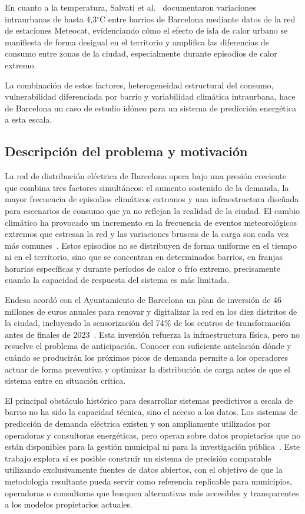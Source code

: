 \documentclass[12pt, a4paper]{article}
\begin{document}
En cuanto a la temperatura, Salvati et al.~\cite{salvati2017} documentaron variaciones intraurbanas de hasta 4,3$^\circ$C entre barrios de Barcelona mediante datos de la red de estaciones Meteocat, evidenciando cómo el efecto de isla de calor urbano se manifiesta de forma desigual en el territorio y amplifica las diferencias de consumo entre zonas de la ciudad, especialmente durante episodios de calor extremo.

La combinación de estos factores, heterogeneidad estructural del consumo, vulnerabilidad diferenciada por barrio y variabilidad climática intraurbana, hace de Barcelona un caso de estudio idóneo para un sistema de predicción energética a esta escala.

\subsection{Descripción del problema y motivación}


La red de distribución eléctrica de Barcelona opera bajo una presión creciente que combina tres factores simultáneos: el aumento sostenido de la demanda, la mayor frecuencia de episodios climáticos extremos y una infraestructura diseñada para escenarios de consumo que ya no reflejan la realidad de la ciudad. El cambio climático ha provocado un incremento en la frecuencia de eventos meteorológicos extremos que estresan la red y las variaciones bruscas de la carga son cada vez más comunes~\cite{moreno2022}. Estos episodios no se distribuyen de forma uniforme en el tiempo ni en el territorio, sino que se concentran en determinados barrios, en franjas horarias específicas y durante períodos de calor o frío extremo, precisamente cuando la capacidad de respuesta del sistema es más limitada.

Endesa acordó con el Ayuntamiento de Barcelona un plan de inversión de 46 millones de euros anuales para renovar y digitalizar la red en los diez distritos de la ciudad, incluyendo la sensorización del 74\% de los centros de transformación antes de finales de 2023~\cite{endesa2021}. Esta inversión refuerza la infraestructura física, pero no resuelve el problema de anticipación. Conocer con suficiente antelación dónde y cuándo se producirán los próximos picos de demanda permite a los operadores actuar de forma preventiva y optimizar la distribución de carga antes de que el sistema entre en situación crítica.

El principal obstáculo histórico para desarrollar sistemas predictivos a escala de barrio no ha sido la capacidad técnica, sino el acceso a los datos. Los sistemas de predicción de demanda eléctrica existen y son ampliamente utilizados por operadoras y consultoras energéticas, pero operan sobre datos propietarios que no están disponibles para la gestión municipal ni para la investigación pública~\cite{jiang2024}. Este trabajo explora si es posible construir un sistema de precisión comparable utilizando exclusivamente fuentes de datos abiertos, con el objetivo de que la metodología resultante pueda servir como referencia replicable para municipios, operadoras o consultoras que busquen alternativas más accesibles y transparentes a los modelos propietarios actuales.
\end{document}
